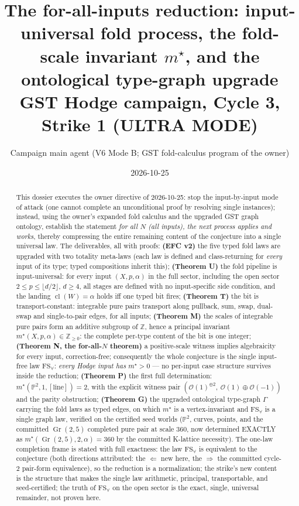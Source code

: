 \documentclass[11pt]{article}
\title{The for-all-inputs reduction: input-universal fold process,
the fold-scale invariant $m^\star$, and the ontological type-graph
upgrade\\
\large GST Hodge campaign, Cycle 3, Strike 1 (ULTRA MODE)}
\author{Campaign main agent (V6 Mode B; GST fold-calculus program of the owner)}
\date{2026-10-25}
\newcommand{\cl}{\operatorname{cl}}
\newcommand{\Oo}{\mathcal{O}}
\newcommand{\Z}{\mathbb{Z}}
\newcommand{\Pp}{\mathbb{P}}
\newcommand{\Gr}{\operatorname{Gr}}
\newcommand{\FS}{\mathrm{FS}_\forall}
\begin{document}
\maketitle

\begin{abstract}
This dossier executes the owner directive of 2026-10-25: stop the
input-by-input mode of attack (one cannot complete an unconditional proof by
resolving single instances); instead, using the owner's expanded fold calculus
and the upgraded GST graph ontology, establish the statement
\emph{for all $N$ (all inputs), the next process applies and works}, thereby
compressing the entire remaining content of the conjecture into a single
universal law.  The deliverables, all with proofs:
\textbf{(EFC v2)} the five typed fold laws are upgraded with two totality
meta-laws (each law is defined and class-returning for \emph{every} input of
its type; typed compositions inherit this);
\textbf{(Theorem U)} the fold pipeline is input-universal: for every input
$(X,p,\alpha)$ in the full sector, including the open sector
$2\le p\le \lfloor d/2\rfloor$, $d\ge4$, all stages are defined with no
input-specific side condition, and the landing
$\cl(W)=\alpha$ holds iff one typed bit fires;
\textbf{(Theorem T)} the bit is transport-constant: integrable pure pairs
transport along pullback, sum, swap, dual-swap and single-to-pair edges,
for all inputs;
\textbf{(Theorem M)} the scales of integrable pure pairs form an additive
subgroup of $\Z$, hence a principal invariant
$m^\star(X,p,\alpha)\in\Z_{\ge0}$: the complete per-type content of the bit is
one integer;
\textbf{(Theorem N, the for-all-$N$ theorem)} a positive-scale witness
implies algebraicity for every input, correction-free; consequently the whole
conjecture is the single input-free law
$\FS$: \emph{every Hodge input has $m^\star>0$} --- no per-input
case structure survives inside the reduction;
\textbf{(Theorem P)} the first full determination:
$m^\star(\Pp^2,1,[\text{line}])=2$, with the explicit witness pair
$(\Oo(1)^{\oplus2},\ \Oo(1)\oplus\Oo(-1))$ and the parity obstruction;
\textbf{(Theorem G)} the upgraded ontological type-graph $\Gamma$ carrying the
fold laws as typed edges, on which $m^\star$ is a vertex-invariant and $\FS$
is a single graph law, verified on the certified seed worlds
($\Pp^2$, curves, points, and the committed $\Gr(2,5)$ completed pure pair at
scale $360$, now determined EXACTLY as
$m^\star(\Gr(2,5),2,\alpha)=360$ by the committed K-lattice necessity).  The
one-law completion frame is stated with full exactness: the law $\FS$ is
equivalent to the conjecture (both directions attributed: the $\Leftarrow$ new
here, the $\Rightarrow$ the committed cycle-2 pair-form equivalence), so the
reduction is a normalization; the strike's new content is the structure that
makes the single law arithmetic, principal, transportable, and seed-certified;
the truth of $\FS$ on the open sector is the exact, single, universal
remainder, not proven here.
\end{abstract}
\end{document}
